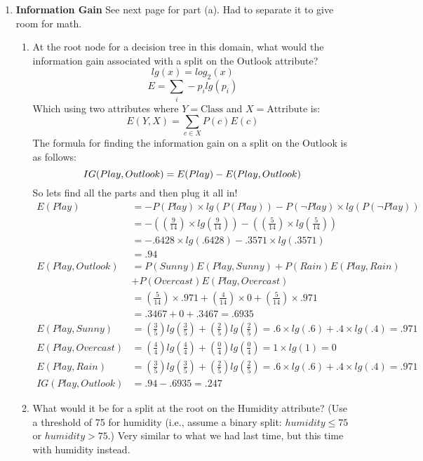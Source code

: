 \documentclass[12pt]{article}
\begin{document}
\begin{enumerate}
\item \textbf{Information Gain} See next page for part (a). Had to separate it to give room for math.
\newpage
\begin{enumerate}
\item At the root node for a decision tree in this domain, what would the information gain associated with a split on the Outlook attribute?\\
\begin{equation*}
lg(x) = log_2(x)
\end{equation*}
\begin{equation*}
E = \sum_i - p_i lg(p_i)
\end{equation*}
Which using two attributes where $Y = \text{Class}$ and $X = \text{Attribute}$ is:\\
\begin{equation*}
E(Y, X) = \sum_{c \in X} P(c) E(c)
\end{equation*}
The formula for finding the information gain on a split on the Outlook is as follows:
\begin{equation*}
IG(Play, Outlook) = E(Play) - E(Play, Outlook)\\
\end{equation*}
So lets find all the parts and then plug it all in!
\begin{align*}
E(Play) &= - P(Play) \times lg(P(Play)) - P(\neg Play) \times lg(P(\neg Play))\\
&= - ((\frac{9}{14}) \times lg(\frac{9}{14})) - ((\frac{5}{14}) \times lg(\frac{5}{14}))\\
&= -.6428 \times lg(.6428) - .3571 \times lg(.3571)\\
&= .94\\
E(Play, Outlook) &= P(Sunny)E(Play, Sunny) + P(Rain)E(Play, Rain)\\
& + P(Overcast)E(Play, Overcast) \\
&= (\frac{5}{14}) \times .971 + (\frac{4}{14}) \times 0 + (\frac{5}{14}) \times .971\\
&= .3467 + 0 + .3467 = .6935\\
E(Play, Sunny) &= (\frac{3}{5})lg(\frac{3}{5}) + (\frac{2}{5})lg(\frac{2}{5})
= .6 \times lg(.6) + .4 \times lg(.4)
= .971\\
E(Play, Overcast) &= (\frac{4}{4})lg(\frac{4}{4}) + (\frac{0}{4})lg(\frac{0}{4})
= 1 \times lg(1)
= 0\\
E(Play, Rain) &= (\frac{3}{5})lg(\frac{3}{5}) + (\frac{2}{5})lg(\frac{2}{5})
= .6 \times lg(.6) + .4 \times lg(.4)
= .971\\
IG(Play, Outlook) &= .94 - .6935 = \boxed{.247}
\end{align*}

\newpage
\item What would it be for a split at the root on the Humidity attribute? (Use a threshold of 75 for humidity (i.e., assume a binary split: $humidity \leq 75$ or $humidity > 75$.)
Very similar to what we had last time, but this time with humidity instead.\\


\end{enumerate}
\newpage

\end{enumerate}
\end{document}
